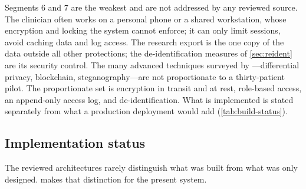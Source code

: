 Segments 6 and 7 are the weakest and are not addressed by any reviewed source. The clinician often works on a personal phone or a shared workstation, whose encryption and locking the system cannot enforce; it can only limit sessions, avoid caching data and log access. The research export is the one copy of the data outside all other protections; the de-identification measures of \cref{sec:reident} are its security control. The many advanced techniques surveyed by \textcite{liu2025review}---differential privacy, blockchain, steganography---are not proportionate to a thirty-patient pilot. The proportionate set is encryption in transit and at rest, role-based access, an append-only access log, and de-identification. What is implemented is stated separately from what a production deployment would add (\cref{tab:build-status}).

\subsection{Implementation status}\label{sec:built-specified}

The reviewed architectures rarely distinguish what was built from what was only designed.  makes that distinction for the present system.

